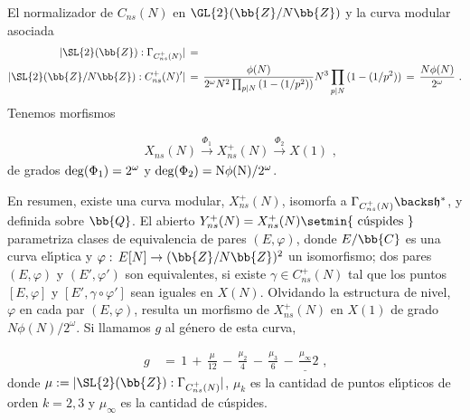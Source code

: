 \begin{subsection}{El normalizador de $C_{ns}(N)$ en $\GL{2}(\bb{Z}/N\bb{Z})$%
			y la curva modular asociada}
\begin{align*}
 |\SL{2}(\bb{Z}):\Gamma_{C_{ns}^{+}(N)}| & \,=\\
 |\SL{2}(\bb{Z}/N\bb{Z}):C_{ns}^{+}(N)'| & \,=\,
 \frac{\phi(N)}{2^{\omega}N^{2}\prod_{p|N}\,(1-(1/p^{2}))}
 N^{3}\prod_{p|N}\,(1-(1/p^{2})) \,=\,\frac{N\phi(N)}{2^{\omega}}
 \text{ .}
\end{align*}
Tenemos morfismos

\begin{align*}
 & X_{ns}(N)\xrightarrow{\Phi_{1}}
 X_{ns}^{+}(N)\xrightarrow{\Phi_{2}} X(1)\text{ ,}
\end{align*}
de grados $\rm{deg}(\Phi_{1})=2^{\omega}$ y
$\rm{deg}(\Phi_{2})=N\phi(N)/2^{\omega}$.

En resumen, existe una curva modular, $X_{ns}^{+}(N)$, isomorfa a
$\Gamma_{C_{ns}^{+}(N)}\backs\frak{h}^{*}$, y definida sobre $\bb{Q}$.
El abierto
$Y_{ns}^{+}(N)=X_{ns}^{+}(N)\setmin\{\text{ c\'{u}spides }\}$
parametriza clases de equivalencia de pares $(E,\varphi)$, donde
$E/\bb{C}$ es una curva el\'{\i}ptica y
$\varphi:\,E[N]\rightarrow(\bb{Z}/N\bb{Z})^{2}$ un isomorfismo; dos pares
$(E,\varphi)$ y $(E',\varphi')$ son equivalentes, si existe
$\gamma\in C_{ns}^{+}(N)$ tal que los puntos $[E,\varphi]$ y
$[E',\gamma\circ\varphi']$ sean iguales en $X(N)$. Olvidando la estructura de
nivel, $\varphi$ en cada par $(E,\varphi)$, resulta un morfismo de $X_{ns}^{+}(N)$
en $X(1)$ de grado $N\phi(N)/2^{\omega}$. Si llamamos $g$ al g\'{e}nero de esta
curva,

\begin{align*}
 g & \,=\,1\,+\,\frac{\mu}{12}\,-\,\frac{\mu_{2}}{4}\,-\,\frac{\mu_{3}}{6}
 \,-\,\frac{\mu_{\infty}}_{2}\text{ ,}
\end{align*}
donde $\mu:=|\SL{2}(\bb{Z}):\Gamma_{C_{ns}^{+}(N)}|$, $\mu_{k}$ es la cantidad
de puntos el\'{\i}pticos de orden $k=2,3$ y $\mu_{\infty}$ es la cantidad de
c\'{u}spides.

\end{subsection}

